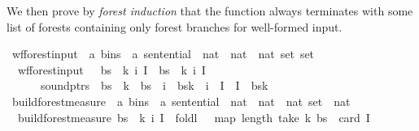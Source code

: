 \begin{isabellebody}
\begin{isamarkuptext}
We then prove by \textit{forest induction} that the function  always terminates
with some list of forests containing only forest branches for well-formed input.%
\end{isamarkuptext}\isamarkuptrue%
\isamarkupfalse%
\ wf{\isacharunderscore}{\kern0pt}forest{\isacharunderscore}{\kern0pt}input\ {\isacharcolon}{\kern0pt}{\isacharcolon}{\kern0pt}\ {\isachardoublequoteopen}{\isacharparenleft}{\kern0pt}{\isacharprime}{\kern0pt}a\ bins\ {\isasymtimes}\ {\isacharprime}{\kern0pt}a\ sentential\ {\isasymtimes}\ nat\ {\isasymtimes}\ nat\ {\isasymtimes}\ nat\ set{\isacharparenright}{\kern0pt}\ set{\isachardoublequoteclose}\ \isanewline
\ \ {\isachardoublequoteopen}wf{\isacharunderscore}{\kern0pt}forest{\isacharunderscore}{\kern0pt}input\ {\isacharequal}{\kern0pt}\ {\isacharbraceleft}{\kern0pt}\ {\isacharparenleft}{\kern0pt}bs{\isacharcomma}{\kern0pt}\ {\isasymomega}{\isacharcomma}{\kern0pt}\ k{\isacharcomma}{\kern0pt}\ i{\isacharcomma}{\kern0pt}\ I{\isacharparenright}{\kern0pt}\ {\isacharbar}{\kern0pt}\ bs\ {\isasymomega}\ k\ i\ I{\isachardot}{\kern0pt}\isanewline
\ \ \ \ \ \ sound{\isacharunderscore}{\kern0pt}ptrs\ {\isasymomega}\ bs\ {\isasymand}\ k\ {\isacharless}{\kern0pt}\ {\isacharbar}{\kern0pt}bs{\isacharbar}{\kern0pt}\ {\isasymand}\ i\ {\isacharless}{\kern0pt}\ {\isacharbar}{\kern0pt}bs{\isacharbang}{\kern0pt}k{\isacharbar}{\kern0pt}\ {\isasymand}\ i\ {\isasymin}\ I\ {\isasymand}\ I\ {\isasymsubseteq}\ {\isacharbraceleft}{\kern0pt}{}{\isachardot}{\kern0pt}{\isachardot}{\kern0pt}{\isacharless}{\kern0pt}{\isacharbar}{\kern0pt}bs{\isacharbang}{\kern0pt}k{\isacharbar}{\kern0pt}{\isacharbraceright}{\kern0pt}\ {\isacharbraceright}{\kern0pt}{\isachardoublequoteclose}\isanewline
\isanewline
{}\isamarkupfalse%
\ build{\isacharunderscore}{\kern0pt}forest{\isacharprime}{\kern0pt}{\isacharunderscore}{\kern0pt}measure\ {\isacharcolon}{\kern0pt}{\isacharcolon}{\kern0pt}\ {\isachardoublequoteopen}{\isacharparenleft}{\kern0pt}{\isacharprime}{\kern0pt}a\ bins\ {\isasymtimes}\ {\isacharprime}{\kern0pt}a\ sentential\ {\isasymtimes}\ nat\ {\isasymtimes}\ nat\ {\isasymtimes}\ nat\ set{\isacharparenright}{\kern0pt}\ {\isasymRightarrow}\ nat{\isachardoublequoteclose}\ \isanewline
\ \ {\isachardoublequoteopen}build{\isacharunderscore}{\kern0pt}forest{\isacharprime}{\kern0pt}{\isacharunderscore}{\kern0pt}measure\ {\isacharparenleft}{\kern0pt}bs{\isacharcomma}{\kern0pt}\ {\isasymomega}{\isacharcomma}{\kern0pt}\ k{\isacharcomma}{\kern0pt}\ i{\isacharcomma}{\kern0pt}\ I{\isacharparenright}{\kern0pt}\ {\isacharequal}{\kern0pt}\ foldl\ {\isacharparenleft}{\kern0pt}{\isacharplus}{\kern0pt}{\isacharparenright}{\kern0pt}\ {}\ {\isacharparenleft}{\kern0pt}map\ length\ {\isacharparenleft}{\kern0pt}take\ {\isacharparenleft}{\kern0pt}k{\isacharplus}{\kern0pt}{}{\isacharparenright}{\kern0pt}\ bs{\isacharparenright}{\kern0pt}{\isacharparenright}{\kern0pt}\ {\isacharminus}{\kern0pt}\ card\ I{\isachardoublequoteclose}\isanewline

\end{isabellebody}
